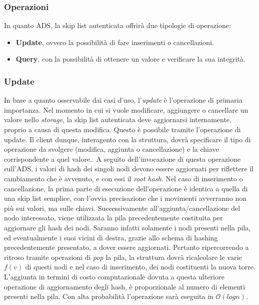 		\subsubsection{Operazioni}
		

			In quanto ADS, la skip list autenticata offrirà due tipologie di operazione:
			
			\begin{itemize}
				\item \textbf{Update}, ovvero la possibilità di fare inserimenti o cancellazioni.
				\item \textbf{Query}, con la possibilità di ottenere un valore e verificare la sua integrità.
			\end{itemize}
			
	\subsubsection{Update}
	

		In base a quanto osservabile dai casi d'uso, l'\textit{update} è l'operazione di primaria importanza. Nel momento in cui si vuole modificare, aggiungere o cancellare un valore nello \textit{storage}, la skip list autenticata deve aggiornarsi internamente, proprio a causa di questa modifica. Questo è possibile tramite l'operazione di update. Il client dunque, interagento con la struttura, dovrà specificare il tipo di operazione da svolgere (modifica, aggiunta o cancellazione) e la chiave corrispondente a quel valore.. 
		A seguito dell'invocazione di questa operazione sull'ADS, i valori di hash dei singoli nodi devono essere aggiornati per riflettere il cambiamento che è avvenuto, e con essi il \textit{root hash}.
		Nel caso di inserimento o cancellazione, la prima parte di esecuzione dell'operazione è identica a quella di una skip list semplice, con l'ovvia precisazione che i movimenti avverranno non più sui valori, ma sulle chiavi. Successivamente all'aggiunta/cancellazione del nodo interessato, viene utilizzata la pila precedentemente costituita per aggiornare gli hash dei nodi. Saranno infatti solamente i nodi presenti nella pila, ed eventualmente i suoi vicini di destra, grazie allo schema di hashing precedentemente presentato, a dover essere aggiornati. Pertanto ripercorrendo a ritroso tramite operazioni di \textit{pop} la pila, la struttura dovrà ricalcolare le varie $ f(v) $ di questi nodi e nel caso di inserimento, dei nodi costituenti la nuova torre.
		L'aggiunta in termini di costo computazionale dovuta a questa ulteriore operazione di aggiornamento degli hash, è proporzionale al numero di elementi presenti nella pila. Con alta probabilità l'operazione sarà eseguita in $\mathcal{O}(log{}n)$.
					
